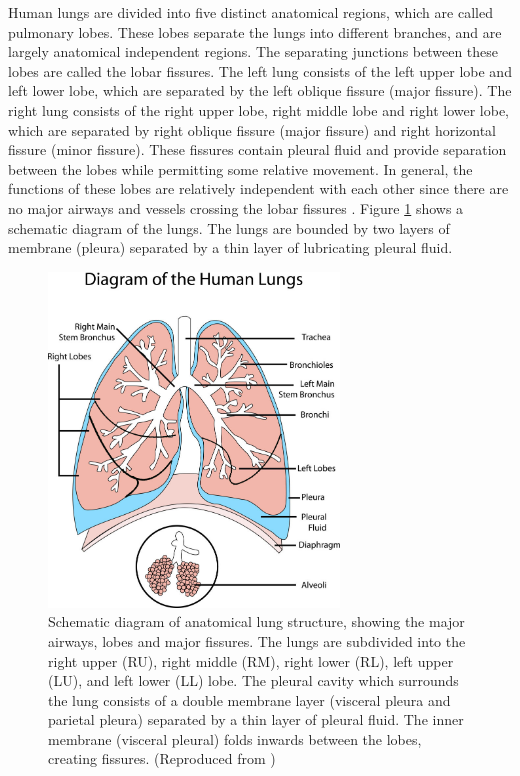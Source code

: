 Human lungs are divided into five distinct anatomical regions, which are called pulmonary lobes. These lobes separate the lungs into different branches, and are largely anatomical independent regions. The separating junctions between these lobes are called the lobar fissures. The left lung consists of the left upper lobe and left lower lobe, which are separated by the left oblique fissure (major fissure). The right lung consists of the right upper lobe, right middle lobe and right lower lobe, which are separated by right oblique fissure (major fissure) and right horizontal fissure (minor fissure). These fissures contain pleural fluid and provide separation between the lobes while permitting some relative movement. In general, the functions of these lobes are relatively independent with each other since there are no major airways and vessels crossing the lobar fissures \citep{lassen2010automatic,doel2015review,ukil2009anatomy}. Figure \ref{fig:LobeAnatomicalStructure} shows a schematic diagram of the lungs. The lungs are bounded by two layers of membrane (pleura) separated by a thin layer of lubricating pleural fluid. 

\begin{figure}[h!]
  \centering 
  \includegraphics[height=3.5in]{Segmentation/Image/LobeAnatomicalStructure.jpg}
  \caption{Schematic diagram of anatomical lung structure, showing the major airways, lobes and major fissures. The lungs are subdivided into the right upper (RU), right middle (RM), right lower (RL), left upper (LU), and left lower (LL) lobe. The pleural cavity which surrounds the lung consists of a double membrane layer (visceral pleura and parietal pleura) separated by a thin layer of pleural fluid. The inner membrane (visceral pleural) folds inwards between the lobes, creating fissures. (Reproduced from \citep{doel2015review})}
  \label{fig:LobeAnatomicalStructure}
\end{figure}

